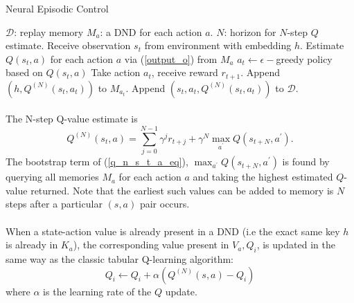 \begin{algorithm}
\caption{Neural Episodic Control} \label{nec_algorithm}
\begin{algorithmic}[h]
	\State $\mathcal{D}$: replay memory
	\State $M_{a}$: a DND for each action $a$.
	\State $N$: horizon for $N$-step $Q$ estimate.
			\State Receive observation $s_t$ from environment with embedding $h$.
			\State Estimate $Q(s_t, a)$ for each action $a$ via (\ref{output_o}) from $M_{a}$
			\State $a_{t} \leftarrow \epsilon-$greedy policy based on $Q(s_t, a)$
			\State Take action $a_{t}$, receive reward $r_{t+1}$.
			\State Append $(h, Q^{(N)}(s_t, a_t))$ to $M_{a_t}$.
			\State Append $(s_t, a_t, Q^{(N)}(s_t, a_t))$ to $\mathcal{D}$.
		\EndFor
	\EndFor
\end{algorithmic}
\end{algorithm}

\paragraph{}The N-step Q-value estimate is 
\begin{equation} \label{q_n_s_t_a_eq}
Q^{(N)}(s_t, a) = \sum_{j=0}^{N-1}\gamma^{j}r_{t+j} + \gamma^{N}\max_{a^{'}}Q(s_{t+N}, a^{'}).
\end{equation}
The bootstrap term of (\ref{q_n_s_t_a_eq}), $\max_{a^{'}}Q(s_{t+N}, a^{'})$ is found by querying all memories $M_{a}$ for each action $a$ and taking the highest estimated $Q$-value returned. Note that the earliest such values can be added to memory is $N$ steps after a particular $(s, a)$ pair occurs.
\paragraph{}When a state-action value is already present in a DND (i.e the exact same key $h$ is already in $K_a$), the corresponding value present in $V_a, Q_i$, is updated in the same way as the classic tabular Q-learning algorithm:
\begin{equation}\label{update_q_i_eq}
Q_{i}\leftarrow Q_{i} + \alpha(Q^{(N)}(s, a)- Q_{i})
\end{equation}
where $\alpha$ is the learning rate of the $Q$ update.